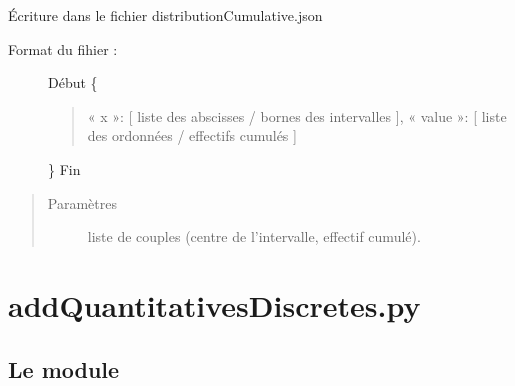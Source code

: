 \documentclass[letterpaper,10pt,openany,oneside,french]{sphinxmanual}
\begin{document}
\begin{fulllineitems}
\label{\detokenize{addQuantitativesContinues:add.addQuantitativesContinues.infoDistributionCumulativeContinue}}
Écriture dans le fichier distributionCumulative.json
\begin{description}
\item[{Format du fihier :}] \leavevmode
Début
\{
\begin{quote}

« x »: {[} liste des abscisses / bornes des intervalles {]},
« value »: {[} liste des ordonnées / effectifs cumulés {]}
\end{quote}

\}
Fin

\end{description}
\begin{quote}\begin{description}
\item[{Paramètres}] \leavevmode
{} \textendash{} liste de couples (centre de l’intervalle, effectif cumulé).

\end{description}\end{quote}

\end{fulllineitems}



\chapter{addQuantitativesDiscretes.py}
\label{\detokenize{addQuantitativesDiscretes:addquantitativesdiscretes-py}}\label{\detokenize{addQuantitativesDiscretes::doc}}\label{\detokenize{addQuantitativesDiscretes:module-add.addQuantitativesDiscretes}}

\section{Le module }
\label{\detokenize{addQuantitativesDiscretes:le-module-analyse-de-donnees-quantitatives-discretes}}
\end{document}
